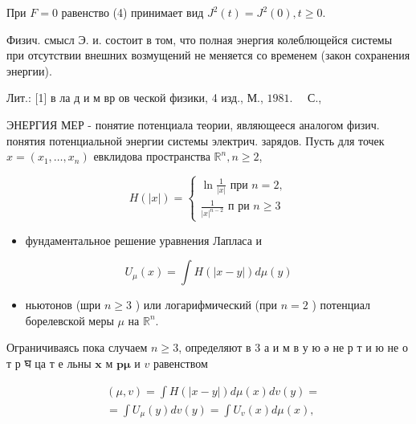 \documentclass[10pt]{article}
\begin{document}
При $F=0$ равенство (4) принимает вид $J^{2}(t)=J^{2}(0), t \geqslant 0$.



Физич. смысл Э. и. состоит в том, что полная энергия колеблющейся системы при отсутствии внешних возмущений не меняется со временем (закон сохранения энергии).



Лит.: [1] в ла д и м вр ов ческой физики, 4 изд., М., $1981 . \quad$ С.,



ЭНЕРГИЯ МЕР - понятие потенциала теории, являющееся аналогом физич. понятия потенциальной энергии системы электрич. зарядов. Пусть для точек $x=\left(x_{1}, \ldots, x_{n}\right)$ евклидова пространства $\mathbb{R}^{n}, n \geqslant 2$,



\[

H(|x|)=\left\{\begin{array}{l}

\ln \frac{1}{|x|} \text { при } n=2, \\

\frac{1}{|x|^{n-2}} \text { п ри } n \geqslant 3

\end{array}\right.

\]



\begin{itemize}

  \item фундаментальное решение уравнения Лапласа и

\end{itemize}



\[

U_{\mu}(x)=\int H(|x-y|) d \mu(y)

\]



\begin{itemize}

  \item ньютонов (шри $n \geqslant 3$ ) или логарифмический (при $n=2$ ) потенциал борелевской меры $\mu$ на $\mathbb{R}^{n}$.

\end{itemize}



Ограничиваясь пока случаем $n \geqslant 3$, определяют в 3 а и м в у ю ә не р т и ю не о т р घ ца т е льны $\mathbf{x}$ м $\mathbf{p} \boldsymbol{\mu}$ и $v$ равенством



\[

\begin{aligned}

& (\mu, v)=\int H(|x-y|) d \mu(x) d v(y)= \\

& =\int U_{\mu}(y) d v(y)=\int U_{v}(x) d \mu(x),

\end{aligned}

\]
\end{document}
